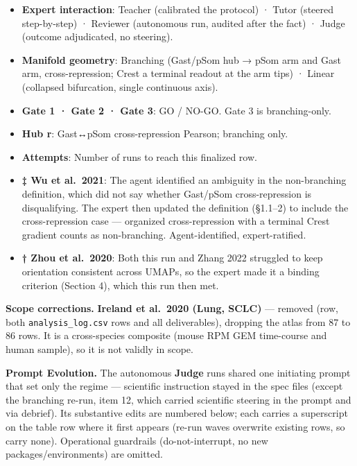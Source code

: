 \documentclass[11pt,a4paper]{article}
\begin{document}
\begin{itemize}
\item
  \textbf{Expert interaction}: Teacher (calibrated the protocol) ·
  Tutor (steered step-by-step) · Reviewer (autonomous run, audited after
  the fact) · Judge (outcome adjudicated, no steering).
\item
  \textbf{Manifold geometry}: Branching (Gast/pSom hub → pSom arm and Gast arm, cross-repression; Crest a terminal readout at the arm tips)
  · Linear (collapsed bifurcation, single continuous axis).
\item
  \textbf{Gate 1 · Gate 2 · Gate 3}: GO / NO-GO. Gate 3 is
  branching-only.
\item
  \textbf{Hub r}: Gast↔pSom cross-repression Pearson; branching only.
\item
  \textbf{Attempts}: Number of runs to reach this finalized row.
\item
  \textbf{‡ Wu et al.~2021}: The agent identified an ambiguity in the
  non-branching definition, which did not say whether Gast/pSom
  cross-repression is disqualifying. The expert then updated the
  definition (§1.1--2) to include the cross-repression case ---
  organized cross-repression with a terminal Crest gradient counts as
  non-branching. Agent-identified, expert-ratified.
\item
  \textbf{† Zhou et al.~2020}: Both this run and Zhang 2022 struggled
  to keep orientation consistent across UMAPs, so the expert made it a
  binding criterion (Section 4), which this run then met.
\end{itemize}

\textbf{Scope corrections.} \textbf{Ireland et al.~2020 (Lung, SCLC)}
--- removed (row, both \texttt{analysis\_log.csv} rows and all deliverables), dropping the atlas from 87 to 86 rows. It is a
cross-species composite (mouse RPM GEM time-course and human sample), so
it is not validly in scope.

\textbf{Prompt Evolution.} The autonomous \textbf{Judge} runs shared one
initiating prompt that set only the regime --- scientific instruction
stayed in the spec files (except the branching re-run, item 12, which
carried scientific steering in the prompt and via debrief). Its
substantive edits are numbered below; each carries a superscript on the
table row where it first appears (re-run waves overwrite existing rows,
so carry none). Operational guardrails (do-not-interrupt, no new
packages/environments) are omitted.
\end{document}
